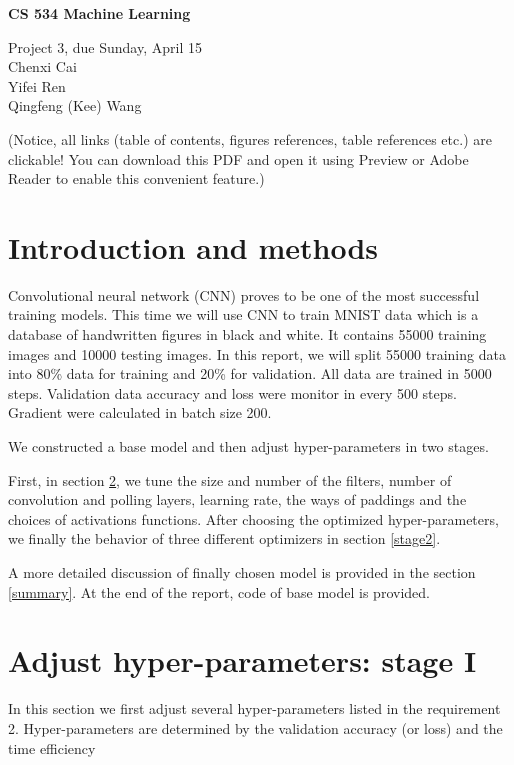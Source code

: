 \documentclass[11pt]{article}
\begin{document}
\begin{center}
  {\bf
  CS 534 Machine Learning  }

\vspace{12pt}

  Project 3, due Sunday, April 15
  \\
  Chenxi Cai \\
  Yifei Ren \\
  Qingfeng (Kee) Wang
 
\end{center}

\vspace{12pt}




\clearpage
(Notice, all links (table of contents, figures references, table references etc.) are clickable! You can download this PDF and open it using Preview or Adobe Reader to enable this convenient feature.)
 
\tableofcontents{}

\clearpage


\section{Introduction and methods}
Convolutional neural network (CNN) proves to be one of the most successful training models. This time we will use CNN to train MNIST data which is a database of handwritten figures in black and white. It contains 55000 training images and 10000 testing images. In this report, we will split 55000 training data into 80\% data for training and 20\% for validation. All data are trained in 5000 steps. Validation data accuracy and loss were monitor in every 500 steps. Gradient were calculated in batch size 200.


We constructed a base model and then adjust  hyper-parameters in two stages. 

First, in section \ref{stage1}, we tune the size and number of the filters, number of convolution and polling layers, learning rate, the ways of paddings and the choices of activations functions. After choosing the optimized hyper-parameters, we finally the behavior of three different optimizers in section \ref{stage2}. 

A more detailed discussion of finally chosen model is provided in the section \ref{summary}. At the end of the report, code of base model is provided.



\section{Adjust hyper-parameters: stage I}
\label{stage1}
In this section we first adjust several hyper-parameters listed in the requirement 2. Hyper-parameters are determined by the validation accuracy (or loss) and the time efficiency
\end{document}
